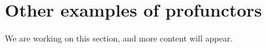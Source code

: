 

\section{Other examples of profunctors}
\begin{publictodo}We are working on this section, and more content will appear.\end{publictodo}


